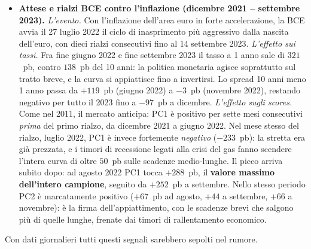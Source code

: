 \documentclass[11pt,a4paper]{article}
\theoremstyle{plain}
\theoremstyle{definition}
\theoremstyle{remark}
\begin{document}
\begin{itemize}
  \item \textbf{Attese e rialzi BCE contro l'inflazione (dicembre 2021 --
        settembre 2023).}
        \emph{L'evento.} Con l'inflazione dell'area euro in forte accelerazione,
        la BCE avvia il 27 luglio 2022 il ciclo di inasprimento più
        aggressivo dalla nascita dell'euro, con dieci rialzi consecutivi fino
        al 14 settembre 2023.
        \emph{L'effetto sui tassi.} Fra fine giugno 2022 e fine settembre
        2023 il tasso a 1 anno sale di $321$~pb, contro $138$~pb del 10 anni:
        la politica monetaria agisce soprattutto sul tratto breve, e la curva
        si appiattisce fino a invertirsi. Lo spread 10 anni meno 1 anno passa
        da $+119$~pb (giugno 2022) a $-3$~pb (novembre 2022), restando
        negativo per tutto il 2023 fino a $-97$~pb a dicembre.
        \emph{L'effetto sugli scores.} Come nel 2011, il mercato anticipa:
        PC1 è positivo per sette mesi consecutivi \emph{prima} del primo
        rialzo, da dicembre 2021 a giugno 2022. Nel mese stesso del rialzo,
        luglio 2022, PC1 è invece fortemente \emph{negativo} ($-233$~pb): la
        stretta era già prezzata, e i timori di recessione legati alla crisi
        del gas fanno scendere l'intera curva di oltre $50$~pb sulle scadenze
        medio-lunghe. Il picco arriva subito dopo: ad agosto 2022 PC1 tocca
        $+288$~pb, il \textbf{valore massimo dell'intero campione}, seguito da
        $+252$~pb a settembre. Nello stesso periodo PC2 è marcatamente
        positivo ($+67$~pb ad agosto, $+44$ a settembre, $+66$ a novembre):
        è la firma dell'appiattimento, con le scadenze brevi che salgono più
        di quelle lunghe, frenate dai timori di rallentamento economico.
\end{itemize}

Con dati giornalieri tutti questi segnali sarebbero sepolti nel rumore.


\end{document}
